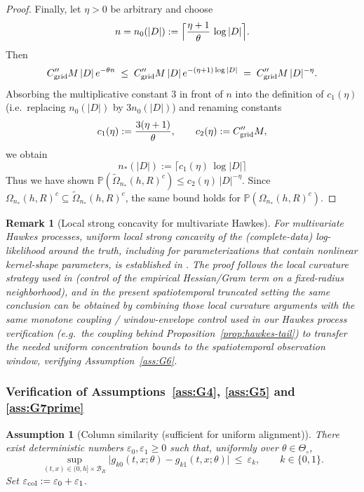 \documentclass{statsoc}
\newtheorem{assumption}[assumption]{Assumption}
\newtheorem{remark}[remark]{Remark}
\newcommand{\bbP}{\mathbb{P}}
\newcommand{\1}{\mathbbm{1}}
\begin{document}
\begin{proof}
Finally, let $\eta>0$ be arbitrary and choose
\[
  n = n_0(|D|)
  := \Bigl\lceil \frac{\eta+1}{\theta}\,\log|D| \Bigr\rceil.
\]
Then
\[
  C''_{\rm grid}M\,|D|\,e^{-\theta n}
  \;\le\; C''_{\rm grid}M\,|D|\,e^{-(\eta+1)\log|D|}
  \;=\; C''_{\rm grid}M\,|D|^{-\eta}.
\]
Absorbing the multiplicative constant $3$ in front of $n$ into the definition of $c_1(\eta)$ (i.e.\ replacing $n_0(|D|)$ by $3n_0(|D|)$) and renaming constants
\[
  c_1(\eta):=\frac{3(\eta+1)}{\theta},
  \qquad
  c_2(\eta):=C''_{\rm grid}M,
\]
we obtain
\[
  n_*(|D|)
  := \bigl\lceil c_1(\eta)\,\log|D| \bigr\rceil
\]
Thus we have shown \(\bbP(\widetilde\Omega_{n_*}(h,R)^c)\le c_2(\eta)\,|D|^{-\eta}\). Since \(\Omega_{n_*}(h,R)^c\subseteq \widetilde\Omega_{n_*}(h,R)^c\), the same bound holds for \(\bbP(\Omega_{n_*}(h,R)^c)\).
\end{proof}

\begin{remark}[Local strong concavity for multivariate Hawkes]\label{rem:hawkes-local-sc}
For multivariate Hawkes processes, uniform local strong concavity of the (complete-data) log-likelihood around the truth, including for parameterizations that contain nonlinear kernel-shape parameters, is established in \citet{DAVISKRESIN_HPB}. The proof follows the local curvature strategy used in \citet{hansen2015lasso} (control of the empirical Hessian/Gram term on a fixed-radius neighborhood), and in the present spatiotemporal truncated setting the same conclusion can be obtained by combining those local curvature arguments with the same monotone coupling / window-envelope control used in our Hawkes process verification (e.g.\ the coupling behind Proposition~\ref{prop:hawkes-tail}) to transfer the needed uniform concentration bounds to the spatiotemporal observation window, verifying Assumption~\ref{ass:G6}.
\end{remark}

\subsubsection{Verification of Assumptions~\ref{ass:G4}, \ref{ass:G5} and \ref{ass:G7prime}}\label{app:hawkes-align}


\begin{assumption}[Column similarity (sufficient for uniform alignment)]
\label{ass:col-sim}
There exist deterministic numbers $\varepsilon_0,\varepsilon_1\ge 0$ such that, uniformly over $\theta\in\Theta_\circ$,
\[
\sup_{(t,x)\in(0,h]\times \mathcal B_R}
\big|g_{k0}(t,x;\theta)-g_{k1}(t,x;\theta)\big|
\ \le\ \varepsilon_k,
\qquad k\in\{0,1\}.
\]
Set $\varepsilon_{\rm col}:=\varepsilon_0+\varepsilon_1$.
\end{assumption}
\end{document}
